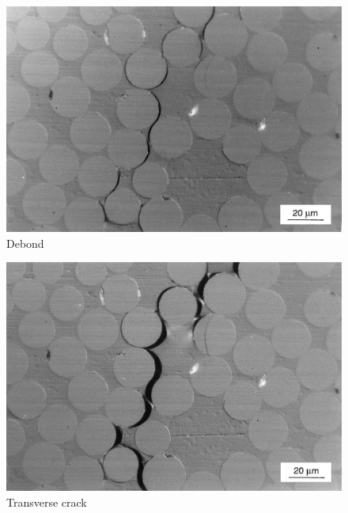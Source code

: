 % 
%               
%          
% 

\begin{subfigure}{0.49\linewidth}
  \setlength{\figwidth}{\linewidth}
  \centering
  \includegraphics[width=\figwidth,height=\figheight,keepaspectratio]{Exp_RVE_GamstedtEK_I_Debond}
  \caption{Debond}%
  \label{fig:Exp:RVE:GamstedtEK:Debond}
\end{subfigure}%
\hfill
\begin{subfigure}{0.49\linewidth}
  \setlength{\figwidth}{\linewidth}
  \centering
  \includegraphics[width=\figwidth,height=\figheight,keepaspectratio]{Exp_RVE_GamstedtEK_II_TransverseCrack}
  \caption{Transverse crack}%
  \label{fig:Exp:RVE:GamstedtEK:TransverseCrack}
\end{subfigure}%